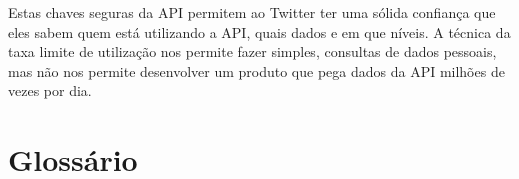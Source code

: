 Estas chaves seguras da API permitem ao Twitter ter uma sólida confiança
que eles sabem quem está utilizando a API, quais dados e em que níveis. A
técnica da taxa limite de utilização nos permite fazer simples, consultas de 
dados pessoais, mas não nos permite desenvolver um produto que pega dados
da API milhões de vezes por dia.

\section{Glossário}

